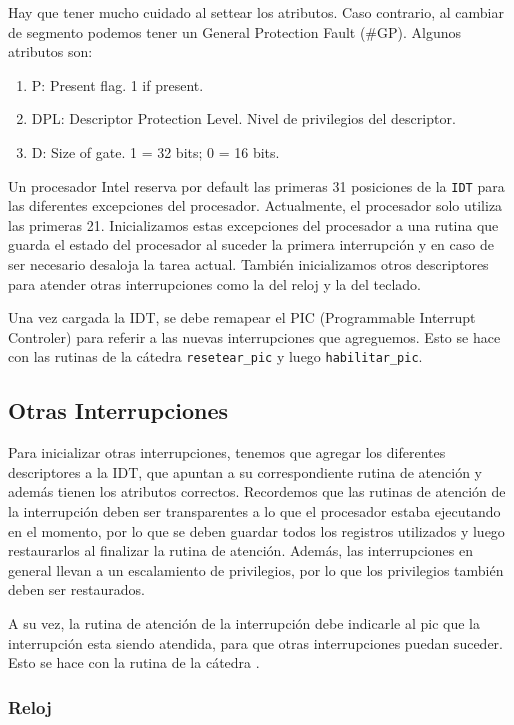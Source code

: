 Hay que tener mucho cuidado al settear los atributos. Caso contrario, al cambiar de segmento podemos tener un General Protection Fault (\#GP). Algunos atributos son:

\begin{enumerate}
\item P: Present flag. 1 if present.
\item DPL: Descriptor Protection Level. Nivel de privilegios del descriptor.
\item D: Size of gate. 1 = 32 bits; 0 = 16 bits.
\end{enumerate}

Un procesador Intel reserva por default las primeras 31 posiciones de la \texttt{IDT} para las diferentes excepciones del procesador. Actualmente, el procesador solo utiliza las primeras 21. Inicializamos estas excepciones del procesador a una rutina que guarda el estado del procesador al suceder la primera interrupción y en caso de ser necesario desaloja la tarea actual. También inicializamos otros descriptores para atender otras interrupciones como la del reloj y la del teclado.

Una vez cargada la IDT, se debe remapear el PIC (Programmable Interrupt Controler) para referir a las nuevas interrupciones que agreguemos. Esto se hace con las rutinas de la cátedra \texttt{resetear\_pic} y luego \texttt{habilitar\_pic}.

\subsection{Otras Interrupciones}

Para inicializar otras interrupciones, tenemos que agregar los diferentes descriptores a la IDT, que apuntan a su correspondiente rutina de atención y además tienen los atributos correctos. Recordemos que las rutinas de atención de la interrupción deben ser transparentes a lo que el procesador estaba ejecutando en el momento, por lo que se deben guardar todos los registros utilizados y luego restaurarlos al finalizar la rutina de atención. Además, las interrupciones en general llevan a un escalamiento de privilegios, por lo que los privilegios también deben ser restaurados.

A su vez, la rutina de atención de la interrupción debe indicarle al pic que la interrupción esta siendo atendida, para que otras interrupciones puedan suceder. Esto se hace con la rutina de la cátedra .

\subsubsection{Reloj}

